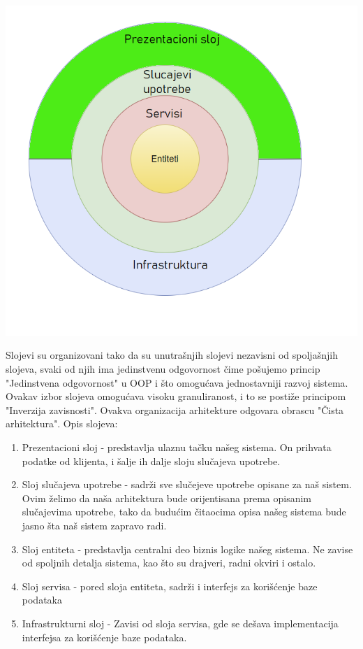 \documentclass[a4paper]{article}
\begin{document}
\begin{center}
    \includegraphics[scale=0.5]{Arhitektura/arhitekturaSistema.png}
\end{center}

Slojevi su organizovani tako da su unutrašnjih slojevi nezavisni od spoljašnjih slojeva, svaki od njih ima jedinstvenu odgovornost čime pošujemo princip "Jedinstvena odgovornost" u OOP i što omogućava jednostavniji razvoj sistema. Ovakav izbor slojeva omogućava visoku granuliranost, i to se postiže principom "Inverzija zavisnosti". Ovakva organizacija arhitekture odgovara obrascu "Čista arhitektura".
\newline
\newline
Opis slojeva:
\newline
\begin{enumerate}
    \item Prezentacioni sloj - predstavlja ulaznu tačku našeg sistema. On prihvata podatke od klijenta, i šalje ih dalje sloju slučajeva upotrebe.
    \item Sloj slučajeva upotrebe - sadrži sve slučejeve upotrebe opisane za naš sistem. Ovim želimo da naša arhitektura bude orijentisana prema opisanim slučajevima upotrebe, tako da budućim čitaocima opisa našeg sistema bude jasno šta naš sistem zapravo radi. 
    \item Sloj entiteta - predstavlja centralni deo biznis logike našeg sistema. Ne zavise od spoljnih detalja sistema, kao što su drajveri, radni okviri i ostalo.
    \item Sloj servisa - pored sloja entiteta, sadrži i interfejs za korišćenje baze podataka
    \item Infrastrukturni sloj - Zavisi od sloja servisa, gde se dešava implementacija interfejsa za korišćenje baze podataka.
\end{enumerate}
\end{document}
